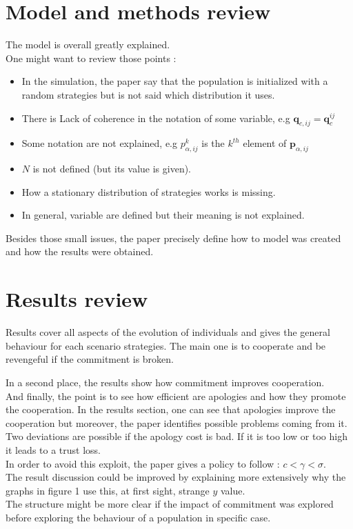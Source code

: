 \documentclass{article}
\begin{document}
\section{Model and methods review}
The model is overall greatly explained.\\
One might want to review those points :
\begin{itemize}
\item In the simulation, the paper say that the population is initialized with a random strategies but is not said which distribution it uses.
\item There is Lack of coherence in the notation of some variable, e.g $\mathbf{q}_{c, ij} = \mathbf{q}_{c}^{ij}$
\item Some notation are not explained, e.g $p^{k}_{\alpha, ij}$ is the $k^{th}$ element of $\mathbf{p}_{\alpha,ij}$
\item $N$ is not defined (but its value is given).
\item How a stationary distribution of strategies works is missing.
\item In general, variable are defined but their meaning is not explained.
\end{itemize}
Besides those small issues, the paper precisely define how to model was created and how the results were obtained.


\section{Results review}
Results cover all aspects of the evolution of individuals and gives the general behaviour for each scenario strategies. The main one is to cooperate and be revengeful if the commitment is broken.

In a second place, the results show how commitment improves cooperation.\\

And finally, the point is to see how efficient are apologies and how they promote the cooperation. In the results section, one can see that apologies improve the cooperation but moreover, the paper identifies possible problems coming from it. \\
Two deviations are possible if the apology cost is bad. If it is too low or too high it leads to a trust loss.\\
In order to avoid this exploit, the paper gives a policy to follow : $c<\gamma<\sigma$.\\

The result discussion could be improved by explaining more extensively why the graphs in figure 1 use this, at first sight, strange $y$ value.\\
The structure might be more clear if the impact of commitment was explored before exploring the behaviour of a population in specific case.
\end{document}
